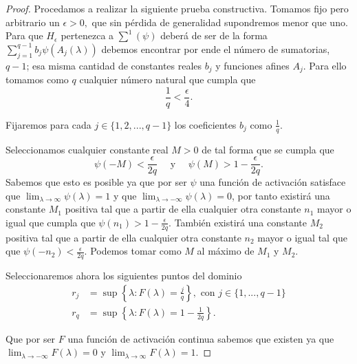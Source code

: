 \begin{proof}
    Procedamos a realizar la siguiente prueba constructiva. 
    Tomamos fijo pero arbitrario un $\epsilon > 0,$ que sin pérdida de generalidad
    supondremos menor que uno.
    Para que $H_\epsilon$ pertenezca a $\sum ^1 (\psi)$ deberá de ser de la 
    forma $\sum^{q-1}_{j=1} b_j \psi( A_j(\lambda))$
    debemos encontrar por ende el número de sumatorias, $q-1$; esa misma cantidad de constantes reales $b_j$ y 
    funciones afines $A_j$. Para ello tomamos como $q$ cualquier número natural que cumpla que 
    \begin{equation}\label{eq:lema_a_2_def_q}
        \frac{1}{q} < \frac{\epsilon}{4}.
    \end{equation}

    Fijaremos para cada $j \in \{1,2, ...,q-1\}$ los coeficientes  $b_j$ como $\frac{1}{q}$. 

    Seleccionamos cualquier constante real $M>0$ de tal forma que 
    se cumpla que
    \begin{equation}\label{lema_a_2_psi_m}
        \psi(-M) < \frac{\epsilon}{2q}
        \quad \text{ y } \quad
        \psi(M) > 1 - \frac{\epsilon}{2q}.
    \end{equation} 
    Sabemos que esto es posible ya que por ser $\psi$ una función de activación satisface que 
    $\lim_{\lambda \longrightarrow \infty} \psi(\lambda) = 1$ y que  $\lim_{\lambda \longrightarrow -\infty} \psi(\lambda) = 0$,
    por tanto existirá una constante $M_1$ positiva tal que a partir de ella cualquier
     otra constante $n_1$ mayor o igual que cumpla que 
    $\psi(n_1) > 1 - \frac{\epsilon}{2q}$. También existirá una constante $M_2$ positiva tal que a partir de 
    ella cualquier otra constante $n_2$ mayor o igual tal que que 
    $\psi(-n_2) < \frac{\epsilon}{2q}$. Podemos tomar como $M$ al máximo de $M_1$ y $M_2$.   

    Seleccionaremos ahora los siguientes puntos del dominio
    \begin{align}\label{lema:2_2_selección_r_F}
        r_j &= \sup \left\{ \lambda: F(\lambda) = \frac{j}{q} \right\},
         \text{ con } j \in \{1, ..., q-1\} 
         \\
        r_q &= \sup \left\{ \lambda: F(\lambda) = 1 - \frac{1}{2 q} \right\}. 
    \end{align}

    Que por ser $F$ una función de activación continua 
    sabemos que existen
    ya que $\lim_{\lambda \longrightarrow - \infty} F(\lambda) = 0$ y 
    $\lim_{\lambda \longrightarrow  \infty} F(\lambda) = 1$. 


\end{proof}
